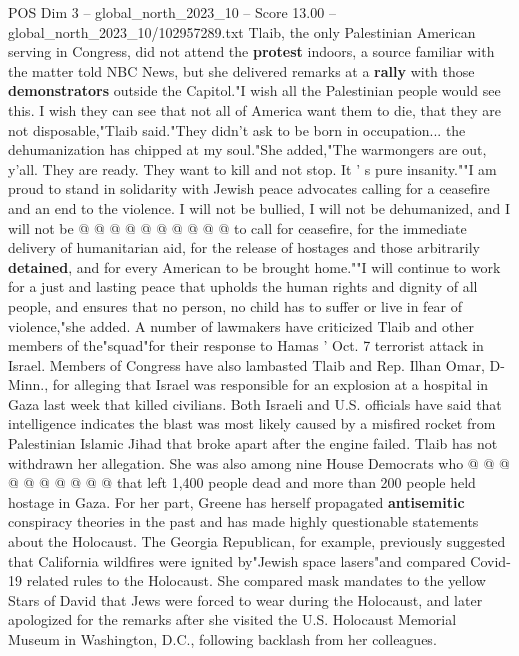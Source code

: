 \begin{textsample}{POS Dim 3 – global\_north\_2023\_10 – Score 13.00 – global\_north\_2023\_10/102957289.txt}
Tlaib, the only Palestinian American serving in Congress, did not attend the \textbf{protest} indoors, a source familiar with the matter told NBC News, but she delivered remarks at a \textbf{rally} with those \textbf{demonstrators} outside the Capitol."I wish all the Palestinian people would see this.
I wish they can see that not all of America want them to die, that they are not disposable,"Tlaib said."They didn't ask to be born in occupation... the dehumanization has chipped at my soul."She added,"The warmongers are out, y'all.
They are ready.
They want to kill and not stop.
It ' s pure insanity.""I am proud to stand in solidarity with Jewish peace advocates calling for a ceasefire and an end to the violence.
I will not be bullied, I will not be dehumanized, and I will not be @ @ @ @ @ @ @ @ @ @ to call for ceasefire, for the immediate delivery of humanitarian aid, for the release of hostages and those arbitrarily \textbf{detained}, and for every American to be brought home.""I will continue to work for a just and lasting peace that upholds the human rights and dignity of all people, and ensures that no person, no child has to suffer or live in fear of violence,"she added.
A number of lawmakers have criticized Tlaib and other members of the"squad"for their response to Hamas ' Oct. 7 terrorist attack in Israel.
Members of Congress have also lambasted Tlaib and Rep.
Ilhan Omar, D-Minn., for alleging that Israel was responsible for an explosion at a hospital in Gaza last week that killed civilians.
Both Israeli and U.S. officials have said that intelligence indicates the blast was most likely caused by a misfired rocket from Palestinian Islamic Jihad that broke apart after the engine failed.
Tlaib has not withdrawn her allegation.
She was also among nine House Democrats who @ @ @ @ @ @ @ @ @ @ that left 1,400 people dead and more than 200 people held hostage in Gaza.
For her part, Greene has herself propagated \textbf{antisemitic} conspiracy theories in the past and has made highly questionable statements about the Holocaust.
The Georgia Republican, for example, previously suggested that California wildfires were ignited by"Jewish space lasers"and compared Covid-19 related rules to the Holocaust.
She compared mask mandates to the yellow Stars of David that Jews were forced to wear during the Holocaust, and later apologized for the remarks after she visited the U.S.
Holocaust Memorial Museum in Washington, D.C., following backlash from her colleagues.

\end{textsample}
